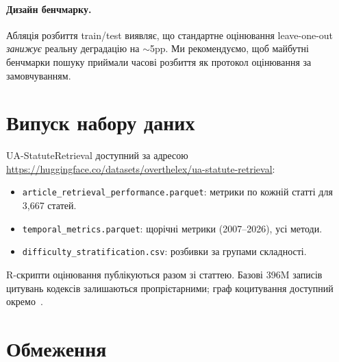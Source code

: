 \paragraph{Дизайн бенчмарку.}
Абляція розбиття train/test виявляє, що стандартне оцінювання leave-one-out \emph{занижує} реальну деградацію на $\sim$5pp.
Ми рекомендуємо, щоб майбутні бенчмарки пошуку приймали часові розбиття як протокол оцінювання за замовчуванням.

\section{Випуск набору даних}
\label{sec:release}

UA-StatuteRetrieval доступний за адресою \url{https://huggingface.co/datasets/overthelex/ua-statute-retrieval}:

\begin{itemize}[nosep,leftmargin=*]
  \item \texttt{article\_retrieval\_performance.parquet}: метрики по кожній статті для 3{,}667 статей.
  \item \texttt{temporal\_metrics.parquet}: щорічні метрики (2007--2026), усі методи.
  \item \texttt{difficulty\_stratification.csv}: розбивки за групами складності.
\end{itemize}

R-скрипти оцінювання публікуються разом зі статтею.
Базові 396M записів цитувань кодексів залишаються пропрієтарними; граф коцитування доступний окремо~\citep{ovcharov2025citation}.

\section{Обмеження}
\label{sec:limitations}

